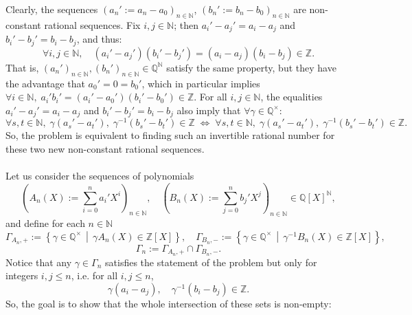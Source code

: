 \begin{solution}
    Clearly, the sequences \( \left( a_n' := a_n - a_0 \right)_{n \in \mathbb{N}} \), \( \left( b_n' := b_n - b_0 \right)_{n \in \mathbb{N}} \) are non-constant rational sequences. Fix \( i, j \in \mathbb{N} \); then \( a_i' - a_j' = a_i - a_j \) and \( b_i' - b_j' = b_i - b_j \), and thus:
    \[
        \forall i,j \in \mathbb{N}, \quad \left( a_i' - a_j' \right)\left( b_i' - b_j' \right) = \left( a_i - a_j \right)\left( b_i - b_j \right) \in \mathbb{Z}.
    \]
    That is, \( \left( a_n' \right)_{n \in \mathbb{N}}, \left( b_n' \right)_{n \in \mathbb{N}} \in \mathbb{Q}^{\mathbb{N}} \) satisfy the same property, but they have the advantage that \( a_0' = 0 = b_0' \), which in particular implies \( \forall i \in \mathbb{N},\; a_i'b_i' = \left( a_i' - a_0' \right)\left( b_i' - b_0' \right) \in \mathbb{Z} \). For all \( i,j \in \mathbb{N} \), the equalities \( a_i' - a_j' = a_i - a_j \) and \( b_i' - b_j' = b_i - b_j \) also imply that \( \forall \gamma \in \mathbb{Q}^{\times} \):
    \[
        \forall s,t \in \mathbb{N},\; \gamma\left( a_s' - a_t' \right),\; \gamma^{-1}\left( b_s' - b_t' \right) \in \mathbb{Z} \;\Leftrightarrow\; \forall s,t \in \mathbb{N},\; \gamma\left( a_s' - a_t' \right),\; \gamma^{-1}\left( b_s' - b_t' \right) \in \mathbb{Z}.
    \]
    So, the problem is equivalent to finding such an invertible rational number for these two new non-constant rational sequences.
    \\\\
    Let us consider the sequences of polynomials
    \[
        \left( A_n\left(X\right) := \sum_{i=0}^{n} a_i' X^{i} \right)_{n\in\mathbb{N}}, \quad \left( B_n\left(X\right) := \sum_{j=0}^{n} b_j' X^{j} \right)_{n\in\mathbb{N}} \in \mathbb{Q}\left[X\right]^{\mathbb{N}},
    \]
    and define for each \( n\in\mathbb{N} \)
    \[
        \Gamma_{A_n,+} := \left\{ \gamma \in \mathbb{Q}^{\times} \,\middle|\, \gamma A_n\left(X\right) \in \mathbb{Z}\left[X\right] \right\}, \quad \Gamma_{B_n,-} := \left\{ \gamma \in \mathbb{Q}^{\times} \,\middle|\, \gamma^{-1} B_n\left(X\right) \in \mathbb{Z}\left[X\right] \right\},
    \]
    \[
        \Gamma_n := \Gamma_{A_n,+} \cap \Gamma_{B_n,-}.
    \]
    Notice that any \( \gamma \in \Gamma_n \) satisfies the statement of the problem but only for integers \( i, j \leq n \), i.e. for all \( i, j \leq n \),
    \[
        \gamma\left( a_i - a_j \right), \quad \gamma^{-1}\left( b_i - b_j \right) \in \mathbb{Z}.
    \]
    So, the goal is to show that the whole intersection of these sets is non-empty:

\end{solution}
